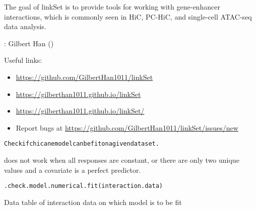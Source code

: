 \documentclass[letterpaper]{book}
\begin{document}
%
\begin{Description}


The goal of linkSet is to provide tools for working with gene-enhancer interactions, which is commonly seen in HiC, PC-HiC, and single-cell ATAC-seq data analysis.
\end{Description}
%
\begin{Author}
: Gilbert Han  ()

\end{Author}
%
\begin{SeeAlso}
Useful links:
\begin{itemize}

\item{} \url{https://github.com/GilbertHan1011/linkSet}
\item{} \url{https://gilberthan1011.github.io/linkSet}
\item{} \url{https://gilberthan1011.github.io/linkSet/}
\item{} Report bugs at \url{https://github.com/GilbertHan1011/linkSet/issues/new}

\end{itemize}


\end{SeeAlso}
%
\begin{Description}
\begin{alltt}Check if chicane model can be fit on a given dataset. 
\end{alltt}


 does not work when all responses are constant, or there are only two unique values and a covariate is a perfect predictor.
\end{Description}
%
\begin{Usage}
\begin{verbatim}
.check.model.numerical.fit(interaction.data)
\end{verbatim}
\end{Usage}
%
\begin{Arguments}
\begin{ldescription}
\item[\code{interaction.data}] Data table of interaction data on which model is to be fit
\end{ldescription}
\end{Arguments}
\end{document}
